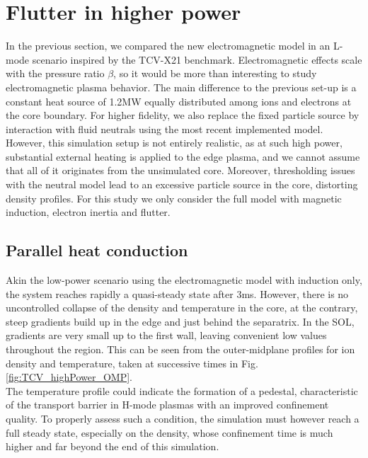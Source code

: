\section{Flutter in higher power}

In the previous section, we compared the new electromagnetic model in an L-mode scenario inspired by the TCV-X21 benchmark. Electromagnetic effects scale with the pressure ratio $\beta$, so it would be more than interesting to study electromagnetic plasma behavior. The main difference to the previous set-up is a constant heat source of 1.2MW equally distributed among ions and electrons at the core boundary. For higher fidelity, we also replace the fixed particle source by interaction with fluid neutrals using the most recent implemented model\cite{quadri2024}. However, this simulation setup is not entirely realistic, as at such high power, substantial external heating is applied to the edge plasma, and we cannot assume that all of it originates from the unsimulated core. Moreover, thresholding issues with the neutral model lead to an excessive particle source in the core, distorting density profiles. For this study we only consider the full model with magnetic induction, electron inertia and flutter.  \\



\subsection{Parallel heat conduction}

Akin  the low-power scenario using the electromagnetic model with induction only, the system reaches rapidly a quasi-steady state after 3ms. However, there is no uncontrolled collapse of the density and temperature in the core, at the contrary, steep gradients build up in the edge and just behind the separatrix. In the SOL, gradients are very small up to the first wall, leaving convenient low values throughout the region. This can be seen from the outer-midplane profiles for ion density and temperature, taken at successive times in Fig. \ref{fig:TCV_highPower_OMP}. \\

The temperature profile could indicate the formation of a pedestal, characteristic of the transport barrier in H-mode plasmas with an improved confinement quality. To properly assess such a condition, the simulation must however reach a full steady state, especially on the density, whose confinement time is much higher and far beyond the end of this simulation. \\

